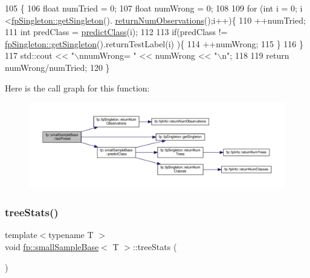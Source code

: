 \begin{DoxyCode}
105                               \{
106                 \textcolor{keywordtype}{float} numTried = 0;
107                 \textcolor{keywordtype}{float} numWrong = 0;
108 
109                 \textcolor{keywordflow}{for} (\textcolor{keywordtype}{int} i = 0; i <\hyperlink{classfp_1_1fpSingleton_a8bdae77b68521003e3fc630edec2e240}{fpSingleton::getSingleton}().
      \hyperlink{classfp_1_1fpSingleton_ae0a2963feb07b809b8740218f1048b67}{returnNumObservations}();i++)\{
110                     ++numTried;
111                     \textcolor{keywordtype}{int} predClass = \hyperlink{classfp_1_1smallSampleBase_a616b7c06887cf4a1ac919bc3846a7933}{predictClass}(i);
112 
113                     \textcolor{keywordflow}{if}(predClass != \hyperlink{classfp_1_1fpSingleton_a8bdae77b68521003e3fc630edec2e240}{fpSingleton::getSingleton}().returnTestLabel(i)
      )\{
114                         ++numWrong;
115                     \}
116                 \}
117                 std::cout << \textcolor{stringliteral}{"\(\backslash\)nnumWrong= "} << numWrong << \textcolor{stringliteral}{"\(\backslash\)n"};
118 
119                 \textcolor{keywordflow}{return} numWrong/numTried;
120             \}
\end{DoxyCode}
Here is the call graph for this function\+:
\nopagebreak
\begin{figure}[H]
\begin{center}
\leavevmode
\includegraphics[width=350pt]{classfp_1_1smallSampleBase_a02b01949b6ed9cc6644b045a468609cc_cgraph}
\end{center}
\end{figure}
\mbox{\label{classfp_1_1smallSampleBase_acc948b260715a190675a5d5ebedf0429}} 
\subsubsection{\texorpdfstring{tree\+Stats()}{treeStats()}}
{\footnotesize\ttfamily template$<$typename T $>$ \\
void \hyperlink{classfp_1_1smallSampleBase}{fp\+::small\+Sample\+Base}$<$ T $>$\+::tree\+Stats (\begin{DoxyParamCaption}{ }\end{DoxyParamCaption})\hspace{0.3cm}{\ttfamily [inline]}}



